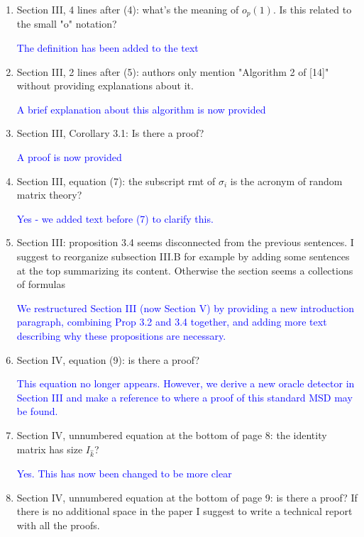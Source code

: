 \documentclass[11pt]{article}
\begin{document}
\begin{enumerate}
\item Section III, 4 lines after (4): what's the meaning of $o_p(1)$. Is this related to the small "o" notation?

  \textcolor{blue}{The definition has been added to the text}

\item Section III, 2 lines after (5): authors only mention "Algorithm 2 of [14]" without providing explanations about it.

\textcolor{blue}{A brief explanation about this algorithm is now provided}

\item Section III, Corollary 3.1: Is there a proof?

  \textcolor{blue}{A proof is now provided}

\item Section III, equation (7): the subscript rmt of $\sigma_i$ is the acronym of random matrix theory?

  \textcolor{blue}{Yes - we added text before (7) to clarify this.}

\item Section III: proposition 3.4 seems disconnected from the previous sentences. I suggest to reorganize subsection III.B for example by adding some sentences at the top summarizing its content. Otherwise the section seems a collections of formulas

  \textcolor{blue}{We restructured Section III (now Section V) by providing a new introduction paragraph, combining Prop 3.2 and 3.4 together, and adding more text describing why these propositions are necessary.}

\item Section IV, equation (9): is there a proof?

  \textcolor{blue}{This equation no longer appears. However, we derive a new oracle detector in Section III and make a reference to where a proof of this standard MSD may be found.}

\item Section IV, unnumbered equation at the bottom of page 8: the identity matrix has size $I_{\hat{k}}$?

\textcolor{blue}{Yes. This has now been changed to be more clear}

\item  Section IV, unnumbered equation at the bottom of page 9: is there a proof? If there is no additional space in the paper I suggest to write a technical report with all the proofs.


\end{enumerate}
\end{document}
